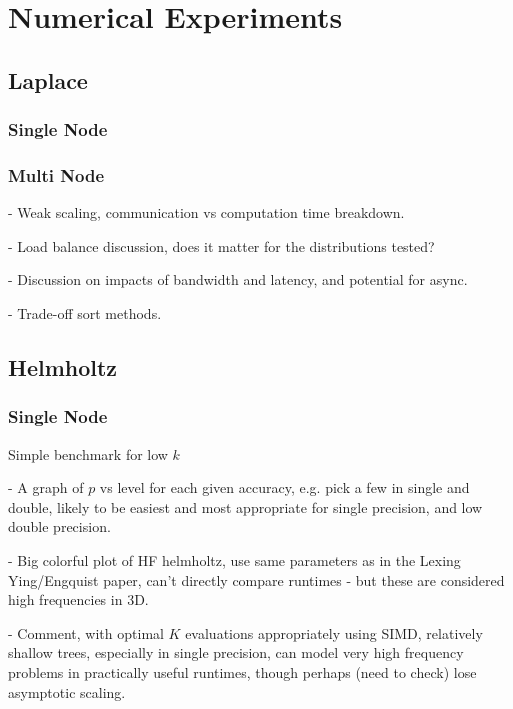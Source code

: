 \chapter{Numerical Experiments}\label{chpt:experiments}
\thispagestyle{chaptertitle} %


\section{Laplace}\label{experiments:sec:laplace}
\subsection{Single Node}\label{chpt:experiments:sec:laplace:sub:single_node}

\subsection{Multi Node}\label{chpt:experiments:sec:laplace:sub:multi_node}

- Weak scaling, communication vs computation time breakdown.

- Load balance discussion, does it matter for the distributions tested?

- Discussion on impacts of bandwidth and latency, and potential for async.

- Trade-off sort methods.


\section{Helmholtz}\label{chpt:experiments:sec:helmholtz}

\subsection{Single Node}\label{chpt:experiments:sec:helmholtz:sub:single_node}

Simple benchmark for low $k$

- A graph of $p$ vs level for each given accuracy, e.g. pick a few in single and double, likely to be easiest and most appropriate for single precision, and low double precision.

- Big colorful plot of HF helmholtz, use same parameters as in the Lexing Ying/Engquist paper, can't directly compare runtimes - but these are considered high frequencies in 3D.

- Comment, with optimal $K$ evaluations appropriately using SIMD, relatively shallow trees, especially in single precision, can model very high frequency problems in practically useful runtimes, though perhaps (need to check) lose asymptotic scaling.


